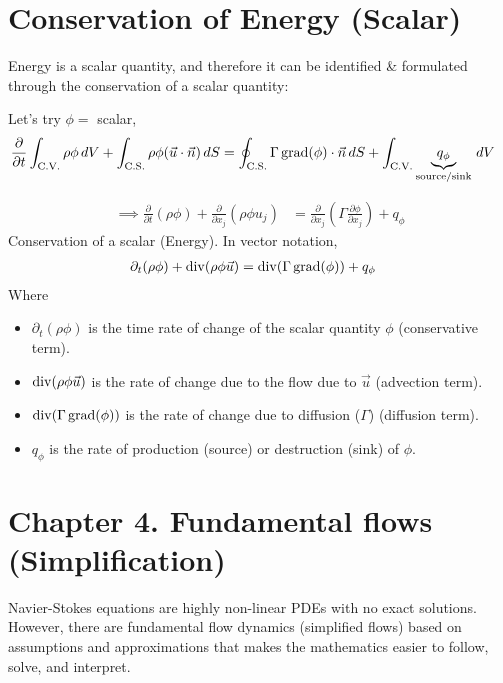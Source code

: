\section*{Conservation of Energy (Scalar)}

Energy is a scalar quantity, and therefore it can be identified \& formulated through the conservation of a scalar quantity:

Let's try $\phi = $ scalar,
\begin{align*}
    \frac{\partial}{\partial t} \int_{\text{C.V.}} \rho \phi \, dV 
    + \int_{\text{C.S.}} \rho \phi (\vec{u} \cdot \vec{n}) \, dS &= 
    \oint_{\text{C.S.}} \Gamma \operatorname{grad}(\phi) \cdot \vec{n} \, dS + 
    \int_{\text{C.V.}} \underbrace{q_{\phi}}_{\text{source/sink}} \, dV
\end{align*}

\begin{align*}
    \implies 
    \frac{\partial}{\partial t} (\rho \phi)  
    + \frac{\partial}{\partial x_j} (\rho \phi u_j) &=
    \frac{\partial}{\partial x_j} (\Gamma \frac{\partial \phi}{\partial x_j}) + q_{\phi}
\end{align*}
Conservation of a scalar (Energy). In vector notation,
\begin{align*}
    \partial_{t} (\rho \phi) + \operatorname{div} (\rho \phi \vec{u}) &= 
    \operatorname{div} (\Gamma \operatorname{grad} (\phi)) + q_{\phi} 
\end{align*}
Where
\begin{itemize}
    \item $\partial_{t} (\rho \phi)$ is the time rate of change of the scalar quantity $\phi$ (conservative term).
    \item $\operatorname{div} (\rho \phi \vec{u})$ is the rate of change due to the flow due to $\vec{u}$ (advection term).
    \item $\operatorname{div} (\Gamma \operatorname{grad} (\phi))$ is the rate of change due to diffusion ($\Gamma$) (diffusion term).
    \item $q_{\phi}$ is the rate of production (source) or destruction (sink) of $\phi$.
\end{itemize}

\section*{Chapter 4. Fundamental flows (Simplification)}
Navier-Stokes equations are highly non-linear PDEs with no exact solutions. However,
there are fundamental flow dynamics (simplified flows) based on assumptions and approximations that 
makes the mathematics easier to follow, solve, and interpret.

